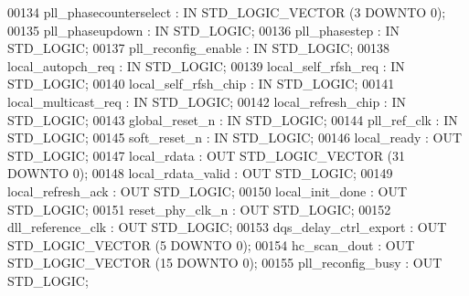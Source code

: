 \begin{DoxyCode}
{00134         pll_phasecounterselect  : \textcolor{keywordflow}{IN} \textcolor{comment}{STD\_LOGIC\_VECTOR} (\textcolor{vhdllogic}{}\textcolor{vhdllogic}{3} \textcolor{keywordflow}{DOWNTO} \textcolor{vhdllogic}{}\textcolor{vhdllogic}{0});
00135         pll_phaseupdown : \textcolor{keywordflow}{IN} \textcolor{comment}{STD\_LOGIC};
00136         pll_phasestep   : \textcolor{keywordflow}{IN} \textcolor{comment}{STD\_LOGIC};
00137         pll_reconfig_enable : \textcolor{keywordflow}{IN} \textcolor{comment}{STD\_LOGIC};
00138         local_autopch_req   : \textcolor{keywordflow}{IN} \textcolor{comment}{STD\_LOGIC};
00139         local_self_rfsh_req : \textcolor{keywordflow}{IN} \textcolor{comment}{STD\_LOGIC};
00140         local_self_rfsh_chip    : \textcolor{keywordflow}{IN} \textcolor{comment}{STD\_LOGIC};
00141         local_multicast_req : \textcolor{keywordflow}{IN} \textcolor{comment}{STD\_LOGIC};
00142         local_refresh_chip  : \textcolor{keywordflow}{IN} \textcolor{comment}{STD\_LOGIC};
00143         global_reset_n  : \textcolor{keywordflow}{IN} \textcolor{comment}{STD\_LOGIC};
00144         pll_ref_clk : \textcolor{keywordflow}{IN} \textcolor{comment}{STD\_LOGIC};
00145         soft_reset_n    : \textcolor{keywordflow}{IN} \textcolor{comment}{STD\_LOGIC};
00146         local_ready : \textcolor{keywordflow}{OUT} \textcolor{comment}{STD\_LOGIC};
00147         local_rdata : \textcolor{keywordflow}{OUT} \textcolor{comment}{STD\_LOGIC\_VECTOR} (\textcolor{vhdllogic}{}\textcolor{vhdllogic}{31} \textcolor{keywordflow}{DOWNTO} \textcolor{vhdllogic}{}\textcolor{vhdllogic}{0});
00148         local_rdata_valid   : \textcolor{keywordflow}{OUT} \textcolor{comment}{STD\_LOGIC};
00149         local_refresh_ack   : \textcolor{keywordflow}{OUT} \textcolor{comment}{STD\_LOGIC};
00150         local_init_done : \textcolor{keywordflow}{OUT} \textcolor{comment}{STD\_LOGIC};
00151         reset_phy_clk_n : \textcolor{keywordflow}{OUT} \textcolor{comment}{STD\_LOGIC};
00152         dll_reference_clk   : \textcolor{keywordflow}{OUT} \textcolor{comment}{STD\_LOGIC};
00153         dqs_delay_ctrl_export   : \textcolor{keywordflow}{OUT} \textcolor{comment}{STD\_LOGIC\_VECTOR} (\textcolor{vhdllogic}{}\textcolor{vhdllogic}{5} \textcolor{keywordflow}{DOWNTO} \textcolor{vhdllogic}{}\textcolor{vhdllogic}{0});
00154         hc_scan_dout    : \textcolor{keywordflow}{OUT} \textcolor{comment}{STD\_LOGIC\_VECTOR} (\textcolor{vhdllogic}{}\textcolor{vhdllogic}{15} \textcolor{keywordflow}{DOWNTO} \textcolor{vhdllogic}{}\textcolor{vhdllogic}{0});
00155         pll_reconfig_busy   : \textcolor{keywordflow}{OUT} \textcolor{comment}{STD\_LOGIC};
}
\end{DoxyCode}
